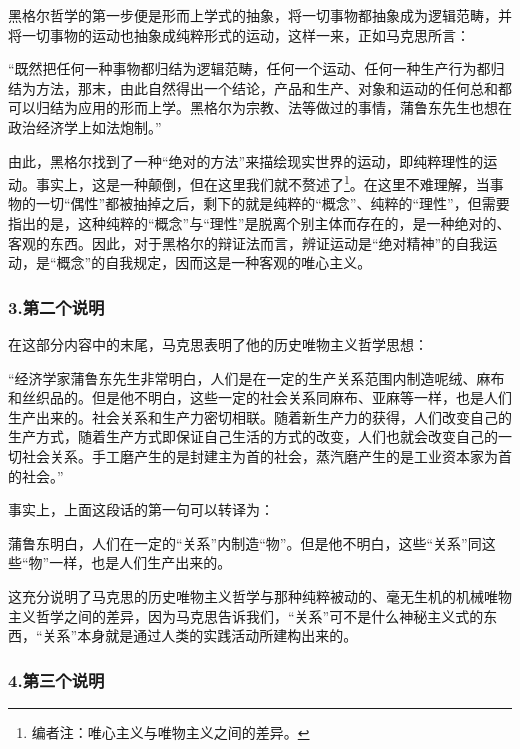 \documentclass[a4paper,twoside,12pt,AutoFakeBold]{ctexart}
\begin{document}
黑格尔哲学的第一步便是形而上学式的抽象，将一切事物都抽象成为逻辑范畴，并将一切事物的运动也抽象成纯粹形式的运动，这样一来，正如马克思所言：

\begin{adjustwidth}{2em}{2em}
    \qquad\fangsong
    “既然把任何一种事物都归结为逻辑范畴，任何一个运动、任何一种生产行为都归结为方法，那末，由此自然得出一个结论，产品和生产、对象和运动的任何总和都可以归结为应用的形而上学。黑格尔为宗教、法等做过的事情，蒲鲁东先生也想在政治经济学上如法炮制。”
\end{adjustwidth}

由此，黑格尔找到了一种“绝对的方法”来描绘现实世界的运动，即纯粹理性的运动。事实上，这是一种颠倒，但在这里我们就不赘述了\footnote{编者注：唯心主义与唯物主义之间的差异。}。在这里不难理解，当事物的一切“偶性”都被抽掉之后，剩下的就是纯粹的“概念”、纯粹的“理性”，但需要指出的是，这种纯粹的“概念”与“理性”是脱离个别主体而存在的，是一种绝对的、客观的东西。因此，对于黑格尔的辩证法而言，辨证运动是“绝对精神”的自我运动，是“概念”的自我规定，因而这是一种客观的唯心主义。


\subsubsection{3.第二个说明}

在这部分内容中的末尾，马克思表明了他的历史唯物主义哲学思想：

\begin{adjustwidth}{2em}{2em}
    \qquad\fangsong
    “经济学家蒲鲁东先生非常明白，人们是在一定的生产关系范围内制造呢绒、麻布和丝织品的。但是他不明白，这些一定的社会关系同麻布、亚麻等一样，也是人们生产出来的。社会关系和生产力密切相联。随着新生产力的获得，人们改变自己的生产方式，随着生产方式即保证自己生活的方式的改变，人们也就会改变自己的一切社会关系。手工磨产生的是封建主为首的社会，蒸汽磨产生的是工业资本家为首的社会。”
\end{adjustwidth}

事实上，上面这段话的第一句可以转译为：

\begin{adjustwidth}{2em}{2em}
    \qquad\fangsong
    蒲鲁东明白，人们在一定的“关系”内制造“物”。但是他不明白，这些“关系”同这些“物”一样，也是人们生产出来的。
\end{adjustwidth}
这充分说明了马克思的历史唯物主义哲学与那种纯粹被动的、毫无生机的机械唯物主义哲学之间的差异，因为马克思告诉我们，“关系”可不是什么神秘主义式的东西，“关系”本身就是通过人类的实践活动所建构出来的。

\subsubsection{4.第三个说明}
\end{document}
